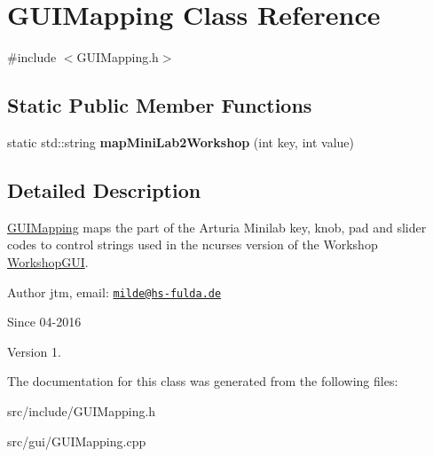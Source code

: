 \hypertarget{classGUIMapping}{\section{G\-U\-I\-Mapping Class Reference}
\label{classGUIMapping}
}


{\ttfamily \#include $<$G\-U\-I\-Mapping.\-h$>$}

\subsection*{Static Public Member Functions}
\begin{DoxyCompactItemize}
\item 
\hypertarget{classGUIMapping_afc4d931e878ba22a7530d39c66c3a966}{static std\-::string {\bfseries map\-Mini\-Lab2\-Workshop} (int key, int value)}\label{classGUIMapping_afc4d931e878ba22a7530d39c66c3a966}

\end{DoxyCompactItemize}


\subsection{Detailed Description}
\hyperlink{classGUIMapping}{G\-U\-I\-Mapping} maps the part of the Arturia Minilab key, knob, pad and slider codes to control strings used in the ncurses version of the Workshop \hyperlink{classWorkshopGUI}{Workshop\-G\-U\-I}.

\begin{DoxyAuthor}{Author}
jtm, email\-:  \href{mailto:milde@hs-fulda.de}{\tt milde@hs-\/fulda.\-de} 
\end{DoxyAuthor}
\begin{DoxySince}{Since}
04-\/2016 
\end{DoxySince}
\begin{DoxyVersion}{Version}
1. 
\end{DoxyVersion}


The documentation for this class was generated from the following files\-:\begin{DoxyCompactItemize}
\item 
src/include/G\-U\-I\-Mapping.\-h\item 
src/gui/G\-U\-I\-Mapping.\-cpp\end{DoxyCompactItemize}
